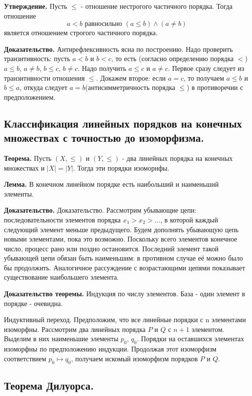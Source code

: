 \documentclass[a4paper, 10pt]{article}
\begin{document}
\textbf{Утверждение.} Пусть $\leqslant$ - отношение нестрогого частичного порядка. Тогда отношение $$a < b \text{ равносильно } (a \leqslant b) \wedge (a \neq b)$$ является отношением строгого частичного порядка.

\textbf{Доказательство.} Антирефлексивность ясна по построению. Надо проверить транзитивность: пусть $a < b$ и $b < c$, то есть (согласно определению порядка $<$) $a \leqslant b$, $a \neq b$, $b \leqslant c$, $b \neq c$. Надо получить $a \leqslant c$ и $a \neq c$. Первое сразу следует из транзитивности отношения $\leqslant$. Докажем второе: если $a = c$, то получаем $a \leqslant b$ и $b \leqslant a$, откуда следует $a = b$(антисимметричность порядка $\leqslant$) в противоречии с предположением.

\subsection{Классификация линейных порядков на конечных множествах с точностью до изоморфизма.}

\textbf{Теорема.} Пусть $(X, \leqslant)$ и $(Y, \leqslant)$ - два линейных порядка на конечных множествах и $|X| = |Y|$. Тогда эти порядки изоморнфы.

\textbf{Лемма.} В конечном линейном порядке есть наибольший и наименьший элементы.

\textbf{Доказательство.} Доказательство. Рассмотрим убывающие цепи: последовательности элементов порядка $x_1 > x_2 > \dots$, в которой каждый следующий элемент меньше предыдущего. Будем дополнять убывающую цепь новыми элементами, пока это возможно. Поскольку всего элементов конечное число, процесс рано или поздно остановится. Последний элемент такой убывающей цепи обязан быть наименьшим: в противном случае её можно было бы продолжить.
Аналогичное рассуждение с возрастающими цепями показывает существование наибольшего элемента.

\textbf{Доказательство теоремы.}  Индукция по числу элементов. База - один элемент в порядке - очевидна.

Индуктивный переход. Предположим, что все линейные порядки с n элементами изоморфны. Рассмотрим два линейных порядка $P$ и $Q$ с $n + 1$ элементом. Выделим в них наименьшие элементы $p_0$, $q_0$. Порядки на оставшихся элементах изоморфны по предположению индукции. Продолжая этот изоморфизм соответствием $p_0 \mapsto  q_0$, получаем искомый изоморфизм порядков $P$ и $Q$.

\subsection{Теорема Дилуорса.}
\end{document}
